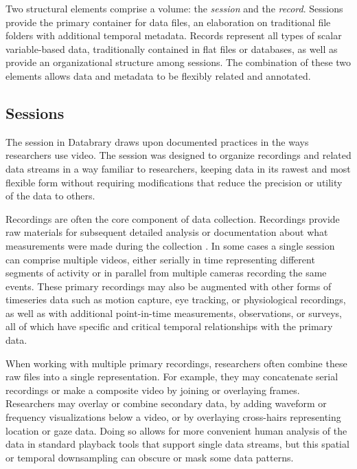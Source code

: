 \documentclass{sig-alternate}
\begin{document}
Two structural elements comprise a volume: the \emph{session} and the \emph{record}.
Sessions provide the primary container for data files, an elaboration on traditional file folders with additional temporal metadata. 
Records represent all types of scalar variable-based data, traditionally contained in flat files or databases, as well as provide an organizational structure among sessions.
The combination of these two elements allows data and metadata to be flexibly related and annotated.

\subsection{Sessions}

The session in Databrary draws upon documented practices in the ways researchers use video. 
The session was designed to organize recordings and related data streams in a way familiar to researchers, keeping data in its rawest and most flexible form without requiring  modifications that reduce the precision or utility of the data to others.

Recordings are often the core component of data collection.
Recordings provide raw materials for subsequent detailed analysis or documentation about what measurements were made during the collection \cite{Bakeman_2012}.
In some cases a single session can comprise multiple videos, either serially in time representing different segments of activity or in parallel from multiple cameras recording the same events.
These primary recordings may also be augmented with other forms of timeseries data such as motion capture, eye tracking, or physiological recordings, as well as with additional point-in-time measurements, observations, or surveys, all of which have specific and critical temporal relationships with the primary data.

When working with multiple primary recordings, researchers often combine these raw files into a single representation.
For example, they may concatenate serial recordings or make a composite video by joining or overlaying frames.
Researchers may overlay or combine secondary data, by adding waveform or frequency visualizations below a video, or by overlaying cross-hairs representing location or gaze data.
Doing so allows for more convenient human analysis of the data in standard playback tools that support single data streams, but this spatial or temporal downsampling can obscure or mask some data patterns.
\end{document}
